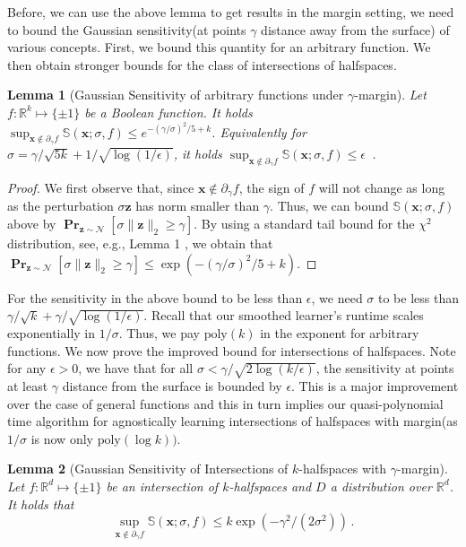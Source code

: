 \documentclass[10pt,a4paper]{article}
\newtheorem{lemma}{Lemma}[section]
\renewcommand\vec[1]{\mathbf{#1}}
\DeclareMathOperator*{\pr}{\mathbf{Pr}}
\newcommand{\normal}{\mathcal{N}}
\newcommand{\R}{\mathbb{R}}
\newcommand{\eps}{\epsilon}
\newcommand{\poly}{\mathrm{poly}}
\newcommand{\1}{\Ind}
\newcommand{\x}{\vec x}
\newcommand{\z}{\vec z}
\begin{document}
Before, we can use the above lemma to get results in the margin setting, we need to bound the Gaussian sensitivity(at points $\gamma$ distance away from the surface) of various concepts. First, we bound this quantity for an arbitrary function. We then obtain stronger bounds for the class of intersections of halfspaces.

\begin{lemma}[Gaussian Sensitivity of arbitrary functions under $\gamma$-margin]
\label{lemma:margin_general}
Let $f:\R^k \mapsto \{\pm 1\}$ be a Boolean function.  
It holds 
$\sup_{\x \notin \partial_\gamma f}\mathbb S(\x; \sigma, f) \leq 
e^{- (\gamma/\sigma)^2/5 + k} $.  Equivalently for $\sigma = \gamma/\sqrt{5 k} + 1/\sqrt{\log(1/\eps)} $, it holds  
$\sup_{\x \notin \partial_\gamma f}\mathbb S(\x; \sigma, f)  \leq \eps$ \,.
\end{lemma}
\begin{proof}
We first observe that, since $\x \notin \partial_\gamma f$, the sign of $f$ will not change
as long as the perturbation $\sigma \vec z$ has norm smaller than $\gamma$. Thus,  we can bound
$\mathbb S(\x;\sigma, f)$ above by $\pr_{\z \sim \normal}[\sigma \|\vec z\|_2 \geq \gamma]$.
By using a standard tail bound for the $\chi^2$ distribution, see, e.g., Lemma 1 \cite{laurent2000adaptive}, we obtain that
$\pr_{\z \sim \normal}[\sigma \|\vec z\|_2 \geq \gamma] 
\leq \exp(-(\gamma/\sigma)^2/5 + k) $.
\end{proof}
For the sensitivity in the above bound to be less than $\epsilon$, we need $\sigma$ to be less than $\gamma/\sqrt{k}+\gamma/\sqrt{\log(1/\epsilon)}$. Recall that our smoothed learner's runtime scales exponentially in $1/\sigma$. Thus, we pay $\poly(k)$ in the exponent for arbitrary functions.
We now prove the improved bound for intersections of halfspaces. Note for any $\epsilon>0$, we have that for all $\sigma< \gamma/\sqrt{2\log(k/\epsilon)}$, the sensitivity at points at least $\gamma$ distance from the surface is bounded by $\epsilon$. This is a major improvement over the case of general functions and this in turn implies our quasi-polynomial time algorithm for agnostically learning intersections of halfspaces with margin(as $1/\sigma$ is now only $\poly(\log k))$.
\begin{lemma}[Gaussian Sensitivity of Intersections of $k$-halfspaces with $\gamma$-margin] \label{proposition:margin-invariance}
Let $f:\R^d \mapsto \{\pm 1\}$ be an intersection of $k$-halfspaces
and $D$ a distribution over $\R^d$.  It holds that
\[
\sup_{\x \notin \partial_\gamma f} \mathbb S(\x; \sigma, f) \leq 
k \exp(- \gamma^2/(2 \sigma^2)) \,.
\]

\end{lemma}
\end{document}
